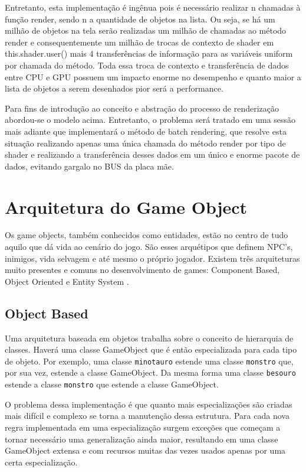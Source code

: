 \documentclass[12pt, 
openright, 
oneside, 
a4paper,    
brazil]{facom-ufu-abntex2}
\begin{document}
Entretanto, esta implementação é ingênua pois é necessário realizar n chamadas à função render, sendo n a quantidade de objetos na lista. Ou seja, se há um milhão de objetos na tela serão realizadas um milhão de chamadas ao método render e consequentemente um milhão de trocas de contexto de shader em this.shader.user() mais 4 transferências de informação para as variáveis uniform por chamada do método. Toda essa troca de contexto e transferência de dados entre CPU e GPU possuem um impacto enorme no desempenho e quanto maior a lista de objetos a serem desenhados pior será a performance.

Para fins de introdução ao conceito e abstração do processo de renderização  abordou-se o modelo acima. Entretanto, o problema será tratado em uma sessão mais adiante que implementará o método de batch rendering, que resolve esta situação realizando apenas uma única chamada do método render por tipo de shader e realizando a transferência desses dados em um único e enorme pacote de dados, evitando gargalo no BUS da placa mãe.

\section{Arquitetura do Game Object}

Os game objects, também conhecidos como entidades, estão no centro de tudo aquilo que dá vida ao cenário do jogo. São esses arquétipos que definem NPC's, inimigos, vida selvagem e até mesmo o próprio jogador. Existem três arquiteturas muito presentes e comuns no desenvolvimento de games: Component Based, Object Oriented e Entity System \cite{GameObjectArchitecture}. 

\subsection{Object Based}
Uma arquitetura baseada em objetos trabalha sobre o conceito de hierarquia de classes. Haverá uma classe GameObject que é então especializada para cada tipo de objeto. Por exemplo, uma classe \texttt{minotauro} estende uma classe \texttt{monstro} que, por sua vez, estende a classe GameObject. Da mesma forma uma classe \texttt{besouro} estende a classe \texttt{monstro} que estende a classe GameObject.

O problema dessa implementação é que quanto mais especializações são criadas mais difícil e complexo se torna a manutenção dessa estrutura. Para cada nova regra implementada em uma especialização surgem exceções que começam a tornar necessário uma generalização ainda maior, resultando em uma classe GameObject extensa e com recursos muitas das vezes usados apenas por uma certa especialização.
\end{document}

